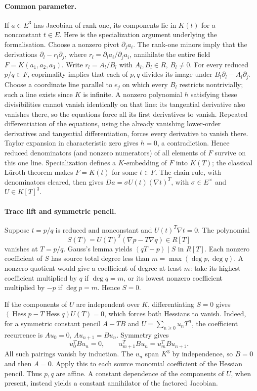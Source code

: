 \documentclass[11pt,a4paper]{article}
\newcommand{\Hess}{\operatorname{Hess}}
\begin{document}
\paragraph{Common parameter.} If $a\in E^3$ has Jacobian of rank one, its components lie in $K(t)$ for a nonconstant $t\in E$. Here is the specialization argument underlying the formalisation. Choose a nonzero pivot $\partial_j a_i$. The rank-one minors imply that the derivations $\partial_l-r_l\partial_j$, where $r_l=\partial_l a_i/\partial_j a_i$, annihilate the entire field $F=K(a_1,a_2,a_3)$. Write $r_l=A_l/B_l$ with $A_l,B_l\in R$, $B_l\ne0$. For every reduced $p/q\in F$, coprimality implies that each of $p,q$ divides its image under $B_l\partial_l-A_l\partial_j$. Choose a coordinate line parallel to $e_j$ on which every $B_l$ restricts nontrivially; such a line exists since $K$ is infinite. A nonzero polynomial $h$ satisfying these divisibilities cannot vanish identically on that line: its tangential derivative also vanishes there, so the equations force all its first derivatives to vanish. Repeated differentiation of the equations, using the already vanishing lower-order derivatives and tangential differentiation, forces every derivative to vanish there. Taylor expansion in characteristic zero gives $h=0$, a contradiction. Hence reduced denominators (and nonzero numerators) of all elements of $F$ survive on this one line. Specialization defines a $K$-embedding of $F$ into $K(T)$; the classical L\"uroth theorem makes $F=K(t)$ for some $t\in F$. The chain rule, with denominators cleared, then gives $Da=\sigma U(t)(\nabla t)^T$, with $\sigma\in E^\times$ and $U\in K[T]^3$.

\paragraph{Trace lift and symmetric pencil.} Suppose $t=p/q$ is reduced and nonconstant and $U(t)^T\nabla t=0$. The polynomial
\[
 S(T)=U(T)^T(\nabla p-T\nabla q)\in R[T]
\]
vanishes at $T=p/q$. Gauss's lemma yields $(qT-p)\mid S$ in $R[T]$. Each nonzero coefficient of $S$ has source total degree less than $m=\max(\deg p,\deg q)$. A nonzero quotient would give a coefficient of degree at least $m$: take its highest coefficient multiplied by $q$ if $\deg q=m$, or its lowest nonzero coefficient multiplied by $-p$ if $\deg p=m$. Hence $S=0$.

If the components of $U$ are independent over $K$, differentiating $S=0$ gives $(\Hess p-T\Hess q)U(T)=0$, which forces both Hessians to vanish. Indeed, for a symmetric constant pencil $A-TB$ and $U=\sum_{n\ge0}u_nT^n$, the coefficient recurrence is $Au_0=0$, $Au_{n+1}=Bu_n$. Symmetry gives
\[
 u_0^TBu_n=0,\qquad u_{m+1}^TBu_n=u_m^TBu_{n+1}.
\]
All such pairings vanish by induction. The $u_n$ span $K^3$ by independence, so $B=0$ and then $A=0$. Apply this to each source monomial coefficient of the Hessian pencil. Thus $p,q$ are affine. A constant dependence of the components of $U$, when present, instead yields a constant annihilator of the factored Jacobian.
\end{document}

